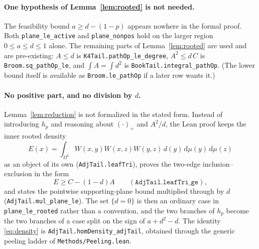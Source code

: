 \documentclass[11pt]{article}
\newcommand{\dd}{\,\mathrm d}
\begin{document}
\paragraph{One hypothesis of Lemma~\ref{lem:rooted} is not needed.}
The feasibility bound $a\geq d-(1-p)$ appears nowhere in the formal proof.  Both
\texttt{plane\_le\_active} and \texttt{plane\_nonpos} hold on the larger region
$0\leq a\leq d\leq1$ alone.  The remaining parts of Lemma~\ref{lem:rooted} are
used and are pre-existing: $A\leq d$ is \texttt{K4Tail.pathOp\_le\_degree},
$A^2\leq d\,C$ is \texttt{Broom.sq\_pathOp\_le}, and $\int A=\int d^2$ is
\texttt{BookTail.integral\_pathOp}.  (The lower bound itself is available as
\texttt{Broom.le\_pathOp} if a later row wants it.)

\paragraph{No positive part, and no division by $d$.}
Lemma~\ref{lem:reduction} is not formalized in the stated form.  Instead of
introducing $h_p$ and reasoning about $(\cdot)_+$ and $A^2/d$, the Lean proof
keeps the inner rooted density
\[
 E(x)=\int_{\Omega^2}W(x,y)W(x,z)W(y,z)\,d(y)\dd\mu(y)\dd\mu(z)
\]
as an object of its own (\texttt{AdjTail.leafTri}), proves the two-edge
inclusion--exclusion in the form
\[
 E\geq C-(1-d)A
 \qquad(\texttt{AdjTail.leafTri\_ge}),
\]
and states the pointwise supporting-plane bound multiplied through by $d$
(\texttt{AdjTail.mul\_plane\_le}).  The set $\{d=0\}$ is then an ordinary case
in \texttt{plane\_le\_rooted} rather than a convention, and the two branches of
$h_p$ become the two branches of a case split on the sign of $a+d^2-d$.  The
identity \eqref{eq:density} is \texttt{AdjTail.homDensity\_adjTail}, obtained
through the generic peeling ladder of \texttt{Methods/Peeling.lean}.
\end{document}
